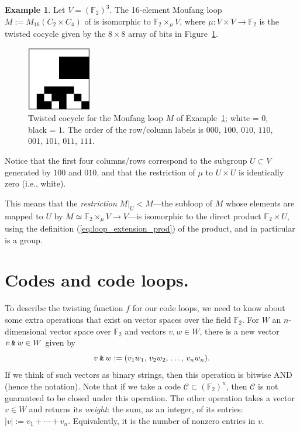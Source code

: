 \documentclass{article}
\theoremstyle{plain}
\theoremstyle{definition}
\newtheorem{example}{Example}
\def \cC {\mathcal{C}}
\def \FF {\mathbb{F}}
\newcommand{\AND}{\mathbin{\textup{\texttt{\&}}}}
\begin{document}
\begin{example}\label{example:m16}
Let $V= (\FF_2)^3$. The 16-element Moufang loop $M := M_{16}(C_2\times C_4)$ of \cite[Theorem 2]{Chein} is isomorphic to $\FF_2 \times_\mu V$,  where  $\mu\colon V\times V\to\FF_2$  is the twisted cocycle given by the $8\times 8$ array of bits in Figure~\ref{fig:cocycle for M}.
\medskip
\begin{figure}[!ht]
\begin{center}
\includegraphics[width=0.25\textwidth]{m16.png}
\end{center}
\caption{Twisted cocycle for the Moufang loop $M$ of Example~\ref{example:m16}; white = $0$, black = $1$. The order of the row/column labels is $000$, $100$, $010$, $110$, $001$, $101$, $011$, $111$. }\label{fig:cocycle for M}
\end{figure}


Notice that the first four columns/rows correspond to the subgroup $U\subset V$ generated by $100$ and $010$, and that the restriction of $\mu$ to $U\times U$ is identically zero (i.e., white). 

This means that the \emph{restriction} $M\big|_U < M$---the subloop of $M$ whose elements are mapped to $U$ by $M \simeq \FF_2\times_\mu V \to V$---is isomorphic to the direct product $\FF_2\times U$, using the definition (\ref{eq:loop_extension_prod}) of the product, and in particular is a group.


\end{example}


\section{Codes and code loops.}

To describe the twisting function $f$ for our code loops, we need to know about some extra operations that exist on vector spaces over the field $\FF_2$. 
For $W$ an $n$-dimensional vector space over $\FF_2$ and vectors $v,w\in W$, there is a new vector $v\AND w \in W$ given by
\[
	v\AND w := (v_1w_1,\,v_2w_2,\,\ldots,\,v_nw_n).
\]
If we think of such vectors as binary strings, then this operation is bitwise AND (hence the notation). 
Note that if we take a code $\cC \subset (\FF_2)^n$, then $\cC$ is not guaranteed to be closed under this operation.
The other operation takes a vector $v\in W$ and returns its \emph{weight}: the sum, as an integer, of its entries: $|v| := v_1 + \cdots + v_n$. 
Equivalently, it is the number of nonzero entries in $v$.
\end{document}
